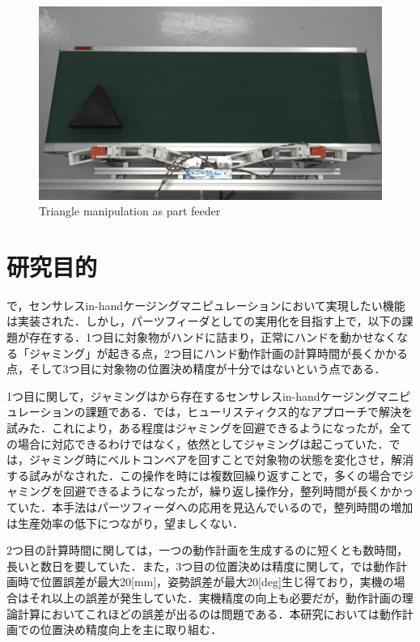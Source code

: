 \documentclass[a4paper,twoside,12pt,papersize, dvipdfmx]{iirthesis}
\begin{document}
\begin{figure}[b]
\begin{minipage}{0.49\hsize}
\subcaption{}
\end{minipage}\hfill
\begin{minipage}{0.49\hsize}
\centering
\includegraphics[width=\hsize]{fig/1-introduction/triangle_Moment_7.jpg}
\subcaption{}
\end{minipage}
\caption{Triangle manipulation as part feeder \cite{kamikukita2022}}
\label{fig::intro::trimani}
\end{figure}

\section{研究目的}\label{sec::intro::objective}
\cite{komiyama2021}で，センサレスin-handケージングマニピュレーションにおいて実現したい機能は実装された．しかし，パーツフィーダとしての実用化を目指す上で，以下の課題が存在する．1つ目に対象物がハンドに詰まり，正常にハンドを動かせなくなる「ジャミング」が起きる点，2つ目にハンド動作計画の計算時間が長くかかる点，そして3つ目に対象物の位置決め精度が十分ではないという点である．\par

1つ目に関して，ジャミングは\cite{asamura2013}から存在するセンサレスin-handケージングマニピュレーションの課題である．\cite{komiyama2021}では，ヒューリスティクス的なアプローチで解決を試みた．これにより，ある程度はジャミングを回避できるようになったが，全ての場合に対応できるわけではなく，依然としてジャミングは起こっていた．\cite{kamikukita2022}では，ジャミング時にベルトコンベアを回すことで対象物の状態を変化させ，解消する試みがなされた．この操作を時には複数回繰り返すことで，多くの場合でジャミングを回避できるようになったが，繰り返し操作分，整列時間が長くかかっていた．本手法はパーツフィーダへの応用を見込んでいるので，整列時間の増加は生産効率の低下につながり，望ましくない．

2つ目の計算時間に関しては，一つの動作計画を生成するのに短くとも数時間，長いと数日を要していた．また，3つ目の位置決めは精度に関して，\cite{komiyama2021}では動作計画時で位置誤差が最大20[mm]，姿勢誤差が最大20[deg]生じ得ており，実機の場合はそれ以上の誤差が発生していた．実機精度の向上も必要だが，動作計画の理論計算においてこれほどの誤差が出るのは問題である．本研究においては動作計画での位置決め精度向上を主に取り組む．
\end{document}
